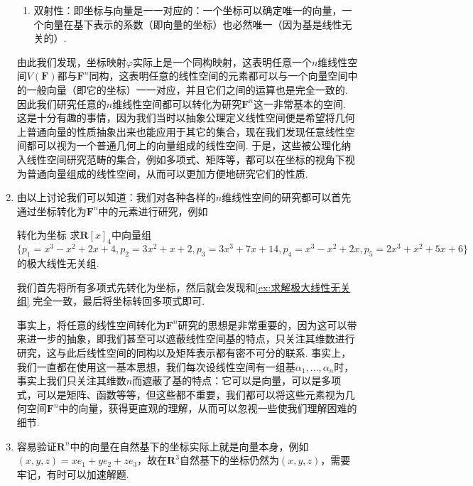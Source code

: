\begin{enumerate}
\begin{enumerate}
              \item 双射性：即坐标与向量是一一对应的：一个坐标可以确定唯一的向量，一个向量在基下表示的系数（即向量的坐标）也必然唯一（因为基是线性无关的）.
          \end{enumerate}
          由此我们发现，坐标映射$\varphi$实际上是一个同构映射，这表明任意一个$n$维线性空间$V(\mathbf{F})$都与$\mathbf{F}^n$同构，这表明任意的线性空间的元素都可以与一个向量空间中的一般向量（即它的坐标）一一对应，并且它们之间的运算也是完全一致的. 因此我们研究任意的$n$维线性空间都可以转化为研究$\mathbf{F}^n$这一非常基本的空间. 这是十分有趣的事情，因为我们当时以抽象公理定义线性空间便是希望将几何上普通向量的性质抽象出来也能应用于其它的集合，现在我们发现任意线性空间都可以视为一个普通几何上的向量组成的线性空间. 于是，这些被公理化纳入线性空间研究范畴的集合，例如多项式、矩阵等，都可以在坐标的视角下视为普通向量组成的线性空间，从而可以更加方便地研究它们的性质.

    \item 由以上讨论我们可以知道：我们对各种各样的$n$维线性空间的研究都可以首先通过坐标转化为$\mathbf{F}^n$中的元素进行研究，例如
          \begin{example}{}{转化为坐标}
              求$\mathbf{R}[x]_4$中向量组$\{p_1=x^3-x^2+2x+4,p_2=3x^2+x+2,p_3=3x^3+7x+14,p_4=x^3-x^2+2x,p_5=2x^3+x^2+5x+6\}$的极大线性无关组.
          \end{example}
          \begin{solution}
              我们首先将所有多项式先转化为坐标，然后就会发现和\autoref{ex:求解极大线性无关组} 完全一致，最后将坐标转回多项式即可.
          \end{solution}

          事实上，将任意的线性空间转化为$\mathbf{F}^n$研究的思想是非常重要的，因为这可以带来进一步的抽象，即我们甚至可以遮蔽线性空间基的特点，只关注其维数进行研究，这与此后线性空间的同构以及矩阵表示都有密不可分的联系. 事实上，我们一直都在使用这一基本思想，我们每次设线性空间有一组基$\alpha_1,\ldots,\alpha_n$时，事实上我们只关注其维数$n$而遮蔽了基的特点：它可以是向量，可以是多项式，可以是矩阵、函数等等，但这些都不重要，我们都可以将这些元素视为几何空间$\mathbf{F}^n$中的向量，获得更直观的理解，从而可以忽视一些使我们理解困难的细节.

    \item 容易验证$\mathbf{R}^n$中的向量在自然基下的坐标实际上就是向量本身，例如$(x,y,z)=xe_1+ye_2+ze_3$，故在$\mathbf{R}^3$自然基下的坐标仍然为$(x,y,z)$，需要牢记，有时可以加速解题.
\end{enumerate}

